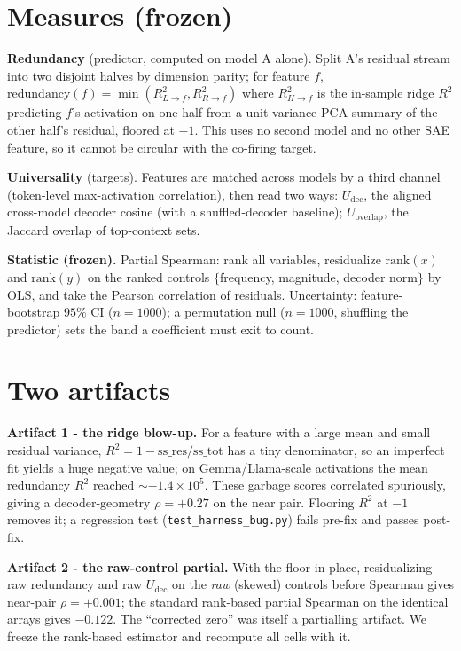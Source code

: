 \documentclass[11pt]{article}
\begin{document}
\section{Measures (frozen)}
\textbf{Redundancy} (predictor, computed on model A alone). Split A's residual stream into two disjoint
halves by dimension parity; for feature $f$, $\mathrm{redundancy}(f)=\min(R^2_{L\to f}, R^2_{R\to f})$
where $R^2_{H\to f}$ is the in-sample ridge $R^2$ predicting $f$'s activation on one half from a
unit-variance PCA summary of the other half's residual, floored at $-1$. This uses no second model and no
other SAE feature, so it cannot be circular with the co-firing target.

\textbf{Universality} (targets). Features are matched across models by a third channel (token-level
max-activation correlation), then read two ways: $U_{\text{dec}}$, the aligned cross-model decoder cosine
(with a shuffled-decoder baseline); $U_{\text{overlap}}$, the Jaccard overlap of top-context sets.

\textbf{Statistic (frozen).} Partial Spearman: rank all variables, residualize $\mathrm{rank}(x)$ and
$\mathrm{rank}(y)$ on the ranked controls $\{$frequency, magnitude, decoder norm$\}$ by OLS, and take the
Pearson correlation of residuals. Uncertainty: feature-bootstrap $95\%$ CI ($n{=}1000$); a permutation
null ($n{=}1000$, shuffling the predictor) sets the band a coefficient must exit to count.

\section{Two artifacts}
\textbf{Artifact 1 - the ridge blow-up.} For a feature with a large mean and small residual variance,
$R^2=1-\mathrm{ss\_res}/\mathrm{ss\_tot}$ has a tiny denominator, so an imperfect fit yields a huge
negative value; on Gemma/Llama-scale activations the mean redundancy $R^2$ reached $\sim{-}1.4\times10^5$.
These garbage scores correlated spuriously, giving a decoder-geometry $\rho=+0.27$ on the near pair.
Flooring $R^2$ at $-1$ removes it; a regression test (\texttt{test\_harness\_bug.py}) fails pre-fix and
passes post-fix.

\textbf{Artifact 2 - the raw-control partial.} With the floor in place, residualizing raw redundancy and
raw $U_{\text{dec}}$ on the \emph{raw} (skewed) controls before Spearman gives near-pair $\rho=+0.001$;
the standard rank-based partial Spearman on the identical arrays gives $-0.122$. The ``corrected zero''
was itself a partialling artifact. We freeze the rank-based estimator and recompute all cells with it.
\end{document}
